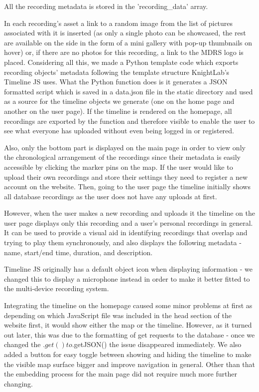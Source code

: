 \documentclass{l3proj}
\begin{document}
All the recording metadata is stored in the 'recording_data' array.


In each recording's asset a link to a random image from the list of pictures associated with it is inserted (as only a single photo can be showcased, the rest are available on the side in the form of a mini gallery with pop-up thumbnails on hover) or, if there are no photos for this recording, a link to the MDRS logo is placed. Considering all this, we made a \gls{Python} template code which exports recording objects' metadata following the template structure KnightLab's Timeline JS uses. What the Python function does is it generates a JSON formatted script which is saved in a data.json file in the static directory and used as a source for the timeline objects we generate (one on the home page and another on the user page). If the timeline is rendered on the homepage, all recordings are exported by the function and therefore visible to enable the user to see what everyone has uploaded without even being logged in or registered.

Also, only the bottom part is displayed on the main page in order to view only the chronological arrangement of the recordings since their metadata is easily accessible by clicking the marker pins on the map. If the user would like to upload their own recordings and store their settings they need to register a new account on the website. Then, going to the user page the timeline initially shows all database recordings as the user does not have any uploads at first.

However, when the user makes a new recording and uploads it the timeline on the user page displays only this recording and a user's personal recordings in general.
It can be used to provide a visual aid in identifying recordings that overlap and trying to play them synchronously, and also displays the following metadata - name, start/end time, duration, and description.

Timeline JS originally has a default object icon when displaying information - we changed this to display a microphone instead in order to make it better fitted to the multi-device recording system.

Integrating the timeline on the homepage caused some minor problems at first as depending on which \gls{JavaScript} file was included in the head section of the website first, it would show either the map or the timeline. However, as it turned out later, this was due to the formatting of get requests to the database - once we changed the $.get() to $.getJSON() the issue disappeared immediately. We also added a button for easy toggle between showing and hiding the timeline to make the visible map surface bigger and improve navigation in general.
Other than that the embedding process for the main page did not require much more further changing.
\end{document}
